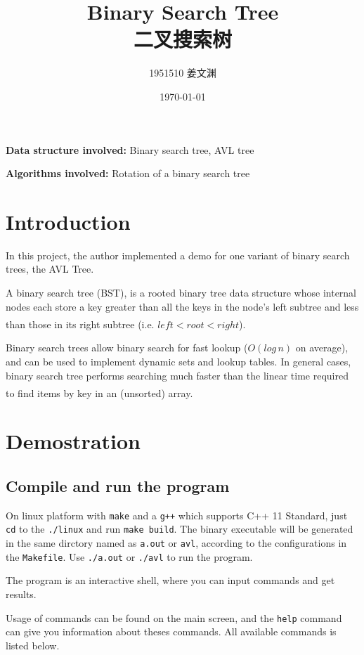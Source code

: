 \documentclass[cn,black,12pt,normal]{elegantnote}
\title{Binary Search Tree\\二叉搜索树}
\author{1951510\; 姜文渊}
\institute{\small \url{https://github.com/jwyjohn/Jwy_DataStructureHomework}}
\date{\today}
\newcommand{\uct}[1]{\textsuperscript{\textsuperscript{\cite{#1}}}}
\begin{document}
\maketitle

\textbf{Data structure involved:} Binary search tree, AVL tree

\textbf{Algorithms involved:} Rotation of a binary search tree

\tableofcontents

\newpage

\section{Introduction}

In this project, the author implemented a demo for one variant of binary search trees, the AVL Tree.

A binary search tree (BST), is a rooted binary tree data structure whose internal nodes each store a key greater than all the keys in the node’s left subtree and less than those in its right subtree (i.e. $left<root<right$).\uct{wiki:Binary_search_tree}

Binary search trees allow binary search for fast lookup ($O(log\,n)$ on average), and can be used to implement dynamic sets and lookup tables. In general cases, binary search tree performs searching much faster than the linear time required to find items by key in an (unsorted) array.\uct{wiki:Binary_search_tree}


\section{Demostration}

\subsection{Compile and run the program}

On linux platform with \lstinline{make} and a \lstinline{g++} which supports C++ 11 Standard, just \lstinline{cd} to the \lstinline{./linux} and run \lstinline{make build}. The binary executable will be generated in the same dirctory named as \lstinline{a.out} or \lstinline{avl}, according to the configurations in the \lstinline{Makefile}. Use \lstinline{./a.out} or \lstinline{./avl} to run the program.

The program is an interactive shell, where you can input commands and get results.

Usage of commands can be found on the main screen, and the \lstinline{help} command can give you information about theses commands.  All available commands is listed below.
\end{document}

